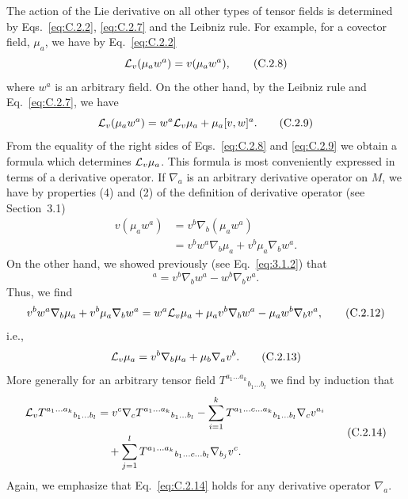 The action of the Lie derivative on all other types of tensor fields is determined by
Eqs.~\eqref{eq:C.2.2}, \eqref{eq:C.2.7} and the Leibniz rule. For example, for a
covector field, \(\mu_a\), we have by Eq.~\eqref{eq:C.2.2}
\begin{equation}
  \mathcal{L}_v(\mu_aw^a)=v(\mu_aw^a),
  \tag{C.2.8}\label{eq:C.2.8}
\end{equation}
where \(w^a\) is an arbitrary field. On the other hand, by the Leibniz rule and
Eq.~\eqref{eq:C.2.7}, we have
\begin{equation}
  \mathcal{L}_v(\mu_aw^a)=w^a\mathcal{L}_v\mu_a+\mu_a[v,w]^a.
  \tag{C.2.9}\label{eq:C.2.9}
\end{equation}
From the equality of the right sides of Eqs.~\eqref{eq:C.2.8} and \eqref{eq:C.2.9}
we obtain a formula which determines \(\mathcal{L}_v\mu_a\). This formula is most
conveniently expressed in terms of a derivative operator. If \(\nabla_a\) is an
arbitrary derivative operator on \(M\), we have by properties (4) and (2) of the
definition of derivative operator (see Section~3.1)
\begin{equation}
\begin{aligned}
  v(\mu_aw^a)
  &=v^b\nabla_b(\mu_aw^a)\\
  &=v^bw^a\nabla_b\mu_a+v^b\mu_a\nabla_bw^a.
\end{aligned}
  \tag{C.2.10}\label{eq:C.2.10}
\end{equation}
On the other hand, we showed previously (see Eq.~\eqref{eq:3.1.2}) that
\begin{equation}
  [v,w]^a=v^b\nabla_bw^a-w^b\nabla_bv^a.
  \tag{C.2.11}\label{eq:C.2.11}
\end{equation}
Thus, we find
\begin{equation}
  v^bw^a\nabla_b\mu_a+v^b\mu_a\nabla_bw^a
  =w^a\mathcal{L}_v\mu_a+\mu_av^b\nabla_bw^a-\mu_aw^b\nabla_bv^a,
  \tag{C.2.12}\label{eq:C.2.12}
\end{equation}
i.e.,
\begin{equation}
  \mathcal{L}_v\mu_a=v^b\nabla_b\mu_a+\mu_b\nabla_av^b.
  \tag{C.2.13}\label{eq:C.2.13}
\end{equation}
More generally for an arbitrary tensor field
\(T^{a_1\ldots a_k}{}_{b_1\ldots b_l}\) we find by induction that
\begin{equation}
\begin{aligned}
  \mathcal{L}_vT^{a_1\ldots a_k}{}_{b_1\ldots b_l}
  & =v^c\nabla_cT^{a_1\ldots a_k}{}_{b_1\ldots b_l}
  -\sum_{i=1}^{k}
  T^{a_1\ldots c\ldots a_k}{}_{b_1\ldots b_l}\nabla_cv^{a_i}\\
  &\quad +\sum_{j=1}^{l}
  T^{a_1\ldots a_k}{}_{b_1\ldots c\ldots b_l}\nabla_{b_j}v^c.
\end{aligned}
  \tag{C.2.14}\label{eq:C.2.14}
\end{equation}
Again, we emphasize that Eq.~\eqref{eq:C.2.14} holds for any derivative operator
\(\nabla_a\).

